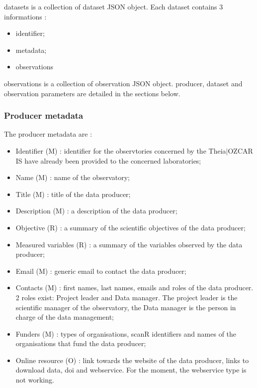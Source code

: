 datasets is a collection of dataset JSON object. Each dataset contains 3 informations :

\begin{itemize}
\item 	 identifier;
\item 	 metadata;
\item 	 observations
\end{itemize}

observations is a collection of observation JSON object. producer, dataset and observation parameters are detailed in the sections below.

\subsubsection{Producer metadata}

The producer metadata are : 

\begin{itemize}
\item 	 Identifier (M) : identifier for the observtories concerned by the Theia$\vert$OZCAR IS have already been provided to the concerned laboratories;
\item 	 Name (M) : name of the observatory;
\item 	 Title (M) : title of the data producer;
\item 	 Description (M) : a description of the data producer;
\item 	 Objective (R) : a summary of the scientific objectives of the data producer;
\item 	 Measured variables (R) : a summary of the variables observed by the data producer;
\item 	 Email (M) : generic email to contact the data producer;
\item 	 Contacts (M) : first names, last names, emails and roles of the data producer. 2 roles exist: Project leader and Data manager. The project leader is the scientific manager of the observatory, the Data manager is the person in charge of the data management;
\item 	 Funders (M) : types of organisations, scanR identifiers and names of the organisations that fund the data producer;
\item 	 Online resource (O) : link towards the website of the data producer, links to download data, doi and webservice. For the moment, the webservice type is not working.
\end{itemize}

